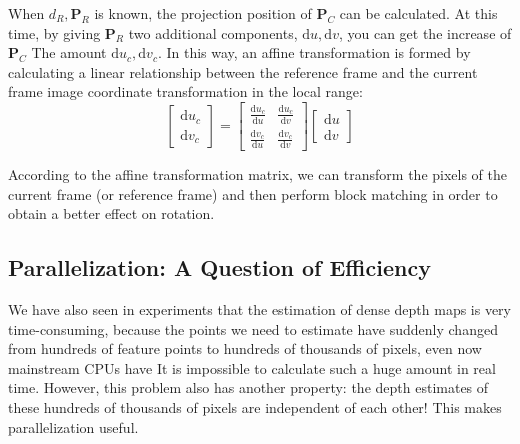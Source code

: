 When $ d_R, \bm{P}_R $ is known, the projection position of $ \bm{P}_C $ can be calculated. At this time, by giving $ \bm{P}_R $ two additional components, $ \mathrm{d} u, \mathrm{d} v $, you can get the increase of $ \bm{P}_C $ The amount $ \mathrm{d} u_c, \mathrm{d} v_c $. In this way, an affine transformation is formed by calculating a linear relationship between the reference frame and the current frame image coordinate transformation in the local range:
\begin{equation}
\left[ \begin{array}{l}
\mathrm{d}u_c\\
\mathrm{d}v_c
\end{array} \right]=\left[ {\begin{array}{*{20}{c}}
	{\frac{{\mathrm{d}u_c}}{{\mathrm{d}u}}}&{\frac{{\mathrm{d}u_c}}{{\mathrm{d}v}}}\\
	{\frac{{\mathrm{d}v_c}}{{\mathrm{d}u}}}&{\frac{{\mathrm{d}v_c}}{{\mathrm{d}v}}}
	\end{array}} \right]\left[ \begin{array}{l}
\mathrm{d}u\\
\mathrm{d}v
\end{array} \right]
\end{equation}

According to the affine transformation matrix, we can transform the pixels of the current frame (or reference frame) and then perform block matching in order to obtain a better effect on rotation.

\subsection{Parallelization: A Question of Efficiency}
We have also seen in experiments that the estimation of dense depth maps is very time-consuming, because the points we need to estimate have suddenly changed from hundreds of feature points to hundreds of thousands of pixels, even now mainstream CPUs have It is impossible to calculate such a huge amount in real time. However, this problem also has another property: the depth estimates of these hundreds of thousands of pixels are independent of each other! This makes parallelization useful.

